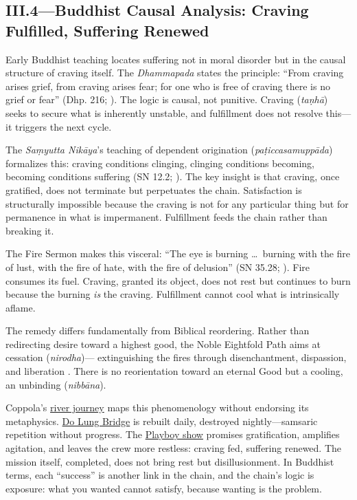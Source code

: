 \subsection*{III.4—Buddhist Causal Analysis: Craving Fulfilled, Suffering Renewed}
\label{ssec:iii-buddhist-causal-analysis}

Early Buddhist teaching locates suffering not in moral disorder but in the causal structure of
craving itself. The \emph{Dhammapada} states the principle: ``From craving arises grief, from
craving arises fear; for one who is free of craving there is no grief or fear'' (Dhp. 216;
\parencite{BuddharakkhitaDhp1993}). The logic is causal, not punitive. Craving (\emph{taṇhā})
seeks to secure what is inherently unstable, and fulfillment does not resolve this---it
triggers the next cycle.

The \emph{Saṃyutta Nikāya}'s teaching of dependent origination
(\emph{paṭiccasamuppāda}) formalizes this: craving conditions clinging, clinging conditions
becoming, becoming conditions suffering (SN 12.2; \parencite[p.~536]{BodhiSN2000}). The key
insight is that craving, once gratified, does not terminate
but perpetuates the chain. Satisfaction is structurally impossible because the craving is not
for any particular thing but for permanence in what is impermanent. Fulfillment feeds the
chain rather than breaking it.

The Fire Sermon makes this visceral: ``The eye is burning \ldots\ burning with the fire of
lust, with the fire of hate, with the fire of delusion'' (SN 35.28;
\parencite[p.~1143]{BodhiSN2000}). Fire consumes its fuel. Craving, granted its object, does
not rest but continues to burn because the burning \emph{is} the craving. Fulfillment cannot
cool what is intrinsically aflame.

The remedy differs fundamentally from Biblical reordering. Rather than redirecting desire
toward a highest good, the Noble Eightfold Path aims at cessation (\emph{nirodha})---
extinguishing the fires through disenchantment, dispassion, and liberation
\parencite[pp.~45--50]{Rahula1959}. There is no reorientation toward an eternal Good but a
cooling, an unbinding (\emph{nibbāna}).

Coppola's \hyperref[scene:upriver-journey]{river journey} maps this phenomenology without
endorsing its metaphysics. \hyperref[scene:do-lung-bridge]{Do Lung Bridge} is rebuilt daily,
destroyed nightly---samsaric repetition without progress. The
\hyperref[scene:playboy-show]{Playboy show} promises gratification, amplifies agitation, and
leaves the crew more restless: craving fed, suffering renewed. The mission itself, completed,
does not bring rest but disillusionment. In Buddhist terms, each ``success'' is another link
in the chain, and the chain's logic is
exposure: what you wanted cannot satisfy, because wanting is the problem.
